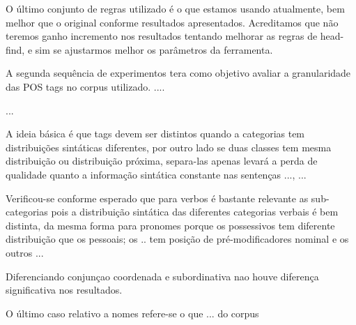 O último conjunto de regras utilizado é o que estamos usando atualmente, bem melhor que o original conforme resultados apresentados. Acreditamos que não teremos ganho incremento nos resultados tentando melhorar as regras de head-find, e sim se ajustarmos melhor os parâmetros da ferramenta.

A segunda sequência de experimentos tera como objetivo avaliar a granularidade das POS tags no corpus utilizado. ....

...


A ideia básica é que tags devem ser distintos quando a categorias tem distribuições sintáticas diferentes, por outro lado se duas classes tem mesma distribuição ou distribuição próxima, separa-las apenas levará a perda de qualidade quanto a informação sintática constante nas sentenças ...,  ...

Verificou-se conforme esperado que para verbos é bastante relevante as sub-categorias pois a distribuição sintática das diferentes categorias verbais é bem distinta, da mesma forma para pronomes porque os possessivos tem diferente distribuição que os pessoais; os .. tem posição de pré-modificadores nominal e os outros ...

Diferenciando conjunçao coordenada e subordinativa nao houve diferença significativa nos resultados.

O último caso relativo a nomes refere-se  o que ... do corpus 

